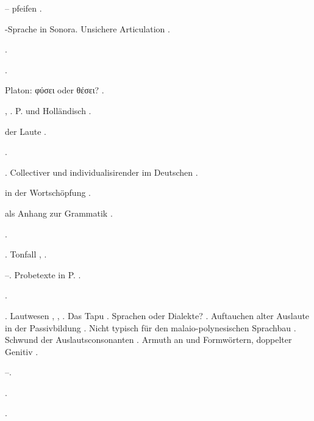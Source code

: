 \begin{register}

 – pfeifen \pageref{sp.208}.

-Sprache in Sonora. Unsichere Articulation \pageref{sp.194}.

 \pageref{sp.264}.

 \pageref{sp.435}.

Platon: φύσει oder θέσει? \pageref{sp.179}.

 \pageref{sp.55}, \pageref{sp.57}. P. und Holländisch \pageref{sp.159}.

 der Laute \pageref{sp.200}.


 \pageref{sp.265}.

 \pageref{sp.101}. Collectiver und individualisirender im Deutschen \pageref{sp.254}.

 in der Wortschöpfung \pageref{sp.42}.

 als Anhang zur Grammatik \pageref{sp.107}.

 \pageref{sp.177}.

. Tonfall \pageref{sp.34}, \pageref{sp.431}. 

 \pageref{sp.27}–\pageref{sp.28}. Probetexte in P. \pageref{sp.106}.

 \pageref{sp.147}.

. Lautwesen \pageref{sp.34}, \pageref{sp.149}, \pageref{sp.197}. Das Tapu \fed{\pageref{fp.46},} \pageref{sp.245}. Sprachen oder Dialekte? \pageref{sp.54}. Auftauchen alter Auslaute in der Passivbildung \pageref{sp.87}. Nicht typisch für den malaio-polynesischen Sprachbau \pageref{sp.415}. Schwund der Auslautsconsonanten \pageref{sp.435}. Armuth an  und Formwörtern, doppelter Genitiv \pageref{sp.463}.

 \pageref{sp.354}–\pageref{sp.359}. 

 \pageref{sp.265}.

 \pageref{sp.54}.




\end{register}
